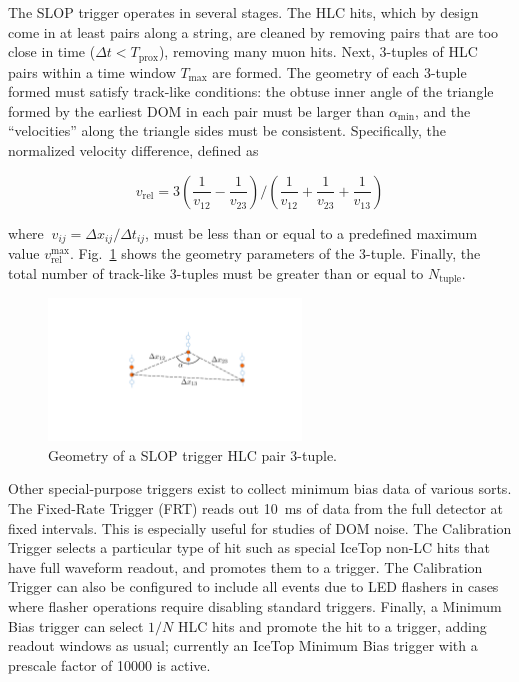 The SLOP trigger operates in several stages.  The HLC hits, which by design
come in at least pairs along a string, are cleaned by removing pairs that
are too close in time ($\Delta t < T_{\mathrm{prox}}$), removing many muon
hits.  Next, 3-tuples of HLC pairs within a time window $T_{\mathrm{max}}$
are formed.  The geometry of each 3-tuple formed must satisfy track-like
conditions: the obtuse inner angle of the triangle formed by the earliest
DOM in each pair must be larger than $\alpha_{\mathrm{min}}$, and the
``velocities'' along the triangle sides must be consistent.  Specifically,
the normalized velocity difference, defined as

\begin{equation}
  v_{\mathrm{rel}} = 3\left(\frac{1}{v_{12}} - \frac{1}{v_{23}}\right)/\left(\frac{1}{v_{12}} +
  \frac{1}{v_{23}} + \frac{1}{v_{13}}\right)
\end{equation}

\noindent where $\ v_{ij} = \Delta x_{ij}/\Delta t_{ij}$, must be less than
or equal to a predefined maximum value
$v_{\mathrm{rel}}^{\mathrm{max}}$.  Fig.~\ref{fig:slop} shows the geometry
parameters of the 3-tuple.  Finally, the total number of track-like 3-tuples
must be greater than or equal to $N_{\mathrm{tuple}}$. 

\begin{figure}[!ht]
 \centering
 \includegraphics[width=0.6\textwidth]{graphics/online/trigger/slop.pdf}
 \caption{Geometry of a SLOP trigger HLC pair 3-tuple.}
 \label{fig:slop}
\end{figure}

Other special-purpose triggers exist to collect minimum bias data of
various sorts.  The Fixed-Rate Trigger (FRT) reads out 10~ms of data from
the full detector at fixed intervals.  This is especially useful for studies
of DOM noise.  The Calibration Trigger selects a particular type of hit
such as special IceTop non-LC hits that have full waveform readout, and promotes
them to a trigger. The Calibration Trigger can also be configured to
include all events due to LED flashers in cases where flasher 
operations require disabling standard triggers. Finally, a Minimum Bias
trigger can select $1/N$ HLC hits and promote the hit to a trigger, adding
readout windows as usual; currently an IceTop Minimum Bias trigger with a
prescale factor of 10000 is active.

